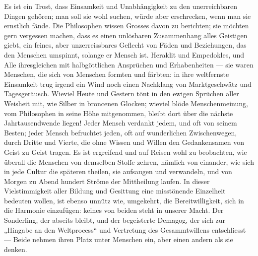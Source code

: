 Es ist ein Trost, dass Einsamkeit und Unabhängigkeit zu den unerreichbaren Dingen gehören; man soll sie wohl suchen, würde aber erschrecken, wenn man sie ernstlich fände. Die Philosophen wissen Grosses davon zu berichten; sie möchten gern vergessen machen, dass es einen unlösbaren Zusammenhang alles Geistigen giebt, ein feines, aber unzerreissbares Geflecht von Fäden und Beziehungen, das den Menschen umspinnt, solange er Mensch ist. Heraklit und Empedokles, und Alle ihresgleichen mit halbgöttlichen Ansprüchen und Erhabenheiten — sie waren Menschen, die sich von Menschen formten und färbten: in ihre weltfernste Einsamkeit trug irgend ein Wind noch einen Nachklang von Marktgeschwätz und Tagesgeräusch. Wieviel Heute und Gestern tönt in den ewigen Sprüchen aller Weisheit mit, wie Silber in broncenen Glocken; wieviel blöde Menschenmeinung, vom Philosophen in seine Höhe mitgenommen, bleibt dort über die nächste Jahrtausendwende liegen! Jeder Mensch verdankt jedem, und oft von seinem Besten; jeder Mensch befruchtet jeden, oft auf wunderlichen Zwischenwegen, durch Dritte und Vierte, die ohne Wissen und Willen den Gedankensamen von Geist zu Geist tragen. Es ist ergreifend und auf Reisen wohl zu beobachten, wie überall die Menschen von demselben Stoffe zehren, nämlich von einander, wie sich in jede Cultur die späteren theilen, sie aufsaugen und verwandeln, und von Morgen zu Abend hundert Ströme der Mittheilung laufen. In dieser Vielstimmigkeit aller Bildung und Gesittung eine misstönende Einzelheit bedeuten wollen, ist ebenso unnütz wie, umgekehrt, die Bereitwilligkeit, sich in die Harmonie einzufügen: keines von beiden steht in unserer Macht. Der Sonderling, der abseits bleibt, und der begeisterte Demagog, der sich zur „Hingabe an den Weltprocess“ und Vertretung des Gesammtwillens entschliesst — Beide nehmen ihren Platz unter Menschen ein, aber einen andern als sie denken.
\par

